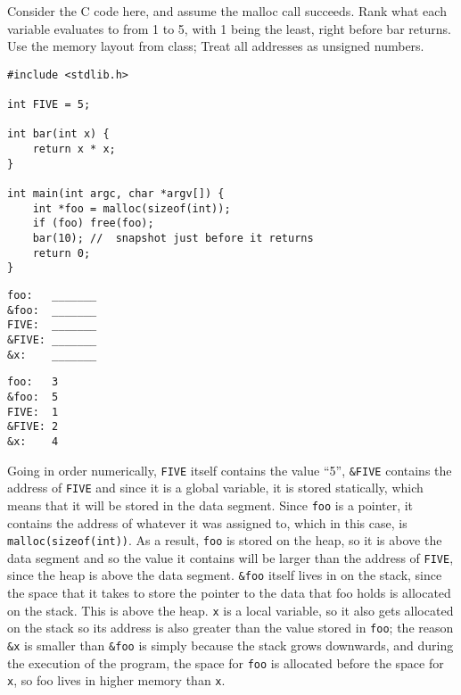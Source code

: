 \begin{blocksection}
\question
Consider the C code here, and assume the malloc call succeeds. Rank what each variable evaluates to from 1 to 5, with 1 being the least, right before bar returns.  Use the memory layout from class;  Treat all addresses as unsigned numbers. 

\begin{verbatim}
#include <stdlib.h> 

int FIVE = 5;

int bar(int x) {
    return x * x;
}

int main(int argc, char *argv[]) { 	
    int *foo = malloc(sizeof(int)); 	
    if (foo) free(foo); 	
    bar(10); //  snapshot just before it returns 	
    return 0; 
}
\end{verbatim}

\begin{verbatim}
foo:   _______
&foo:  _______
FIVE:  _______
&FIVE: _______
&x:    _______
\end{verbatim}

\begin{solution}
\begin{verbatim}
foo:   3
&foo:  5
FIVE:  1
&FIVE: 2
&x:    4
\end{verbatim}

Going in order numerically, \lstinline$FIVE$ itself contains the value “5”, \lstinline$&FIVE$ contains the address of \lstinline$FIVE$ and since it is a global variable, it is stored statically, which means that it will be stored in the data segment. Since \lstinline$foo$ is a pointer, it contains the address of whatever it was assigned to, which in this case, is \lstinline$malloc(sizeof(int))$. As a result, \lstinline$foo$ is stored on the heap, so it is above the data segment and so the value it contains will be larger than the address of \lstinline$FIVE$, since the heap is above the data segment. \lstinline$&foo$ itself lives in on the stack, since the space that it takes to store the pointer to the data that foo holds is allocated on the stack. This is above the heap. \lstinline$x$ is a local variable, so it also gets allocated on the stack so its address is also greater than the value stored in \lstinline$foo$; the reason \lstinline$&x$ is smaller than \lstinline$&foo$ is simply because the stack grows downwards, and during the execution of the program, the space for \lstinline$foo$ is allocated before the space for \lstinline$x$, so foo lives in higher memory than \lstinline$x$.
\end{solution}

\end{blocksection}